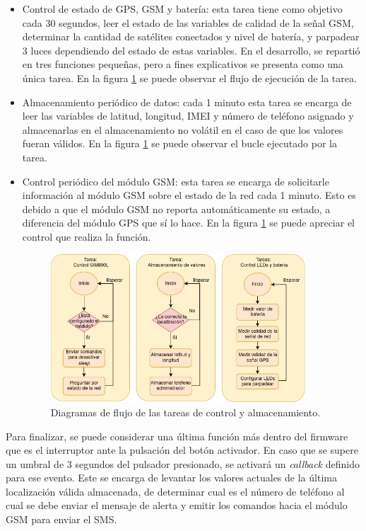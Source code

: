 \begin{itemize}
		\item Control de estado de GPS, GSM y batería: esta tarea tiene como objetivo cada 30 segundos, leer el estado de las variables de calidad de la señal GSM, determinar la cantidad de satélites conectados y nivel de batería, y parpadear 3 luces dependiendo del estado de estas variables. En el desarrollo, se repartió en tres funciones pequeñas, pero a fines explicativos se presenta como una única tarea. En la figura \ref{fig:esp32:tasks3} se puede observar el flujo de ejecución de la tarea.
		\item Almacenamiento periódico de datos: cada 1 minuto esta tarea se encarga de leer las variables de latitud, longitud, IMEI y número de teléfono asignado y almacenarlas en el almacenamiento no volátil en el caso de que los valores fueran válidos. En la figura \ref{fig:esp32:tasks3} se puede observar el bucle ejecutado por la tarea.
		\item Control periódico del módulo GSM: esta tarea se encarga de solicitarle información al módulo GSM sobre el estado de la red cada 1 minuto. Esto es debido a que el módulo GSM no reporta automáticamente su estado, a diferencia del módulo GPS que sí lo hace.  En la figura \ref{fig:esp32:tasks3} se puede apreciar el control que realiza la función.
		
	\begin{figure}[H]
		\centering
		\includegraphics[width=0.9\textwidth]{./Figures/esp32-tasks3.png}
		\caption{Diagramas de flujo de las tareas de control y almacenamiento.}
		\label{fig:esp32:tasks3}
	\end{figure}

\end{itemize}

Para finalizar, se puede considerar una última función más dentro del firmware que es el interruptor ante la pulsación del botón activador. En caso que se supere un umbral de 3 segundos del pulsador presionado, se activará un \textit{callback} definido para ese evento. Este se encarga de levantar los valores actuales de la última localización válida almacenada, de determinar cual es el número de teléfono al cual se debe enviar el mensaje de alerta y emitir los comandos hacia el módulo GSM para enviar el SMS. 

